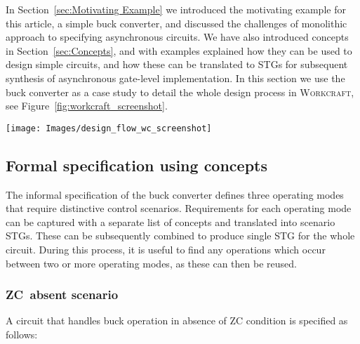 \documentclass[british, journal]{IEEEtran}
\newcommand{\noun}[1]{\textsc{#1}}
\begin{document}
In Section~\ref{sec:Motivating Example} we introduced the motivating example for
this article, a simple buck converter, and discussed the challenges of monolithic
approach to specifying asynchronous circuits. We have also introduced
concepts in Section~\ref{sec:Concepts}, and with examples explained how they can
be used to design simple circuits, and how these can be translated to STGs
for subsequent synthesis of asynchronous gate-level implementation.
In this section we use the buck converter as a case study to detail the
whole design process in \noun{Workcraft}, see Figure~\ref{fig:workcraft_screenshot}.

\begin{figure*}[t]
\begin{centering}
\texttt{[image: Images/design\_flow\_wc\_screenshot]}
\par\end{centering}

\protect\caption{\label{fig:workcraft_screenshot}Stages of the design flow when using asynchronous concepts in \noun{Workcraft}.}
\vspace{-4mm}
\end{figure*}

\subsection{Formal specification using concepts}

The informal specification of the buck converter defines three operating modes
that require distinctive control scenarios. Requirements for each operating mode
can be captured with a separate list of concepts and translated into scenario
STGs. These can be subsequently combined to produce single STG for the whole circuit.
During this process, it is useful to find any operations which occur
between two or more operating modes, as these can then be reused.

\subsubsection{ZC~absent scenario}

A circuit that handles buck operation in absence of ZC condition is specified as follows:
\end{document}
